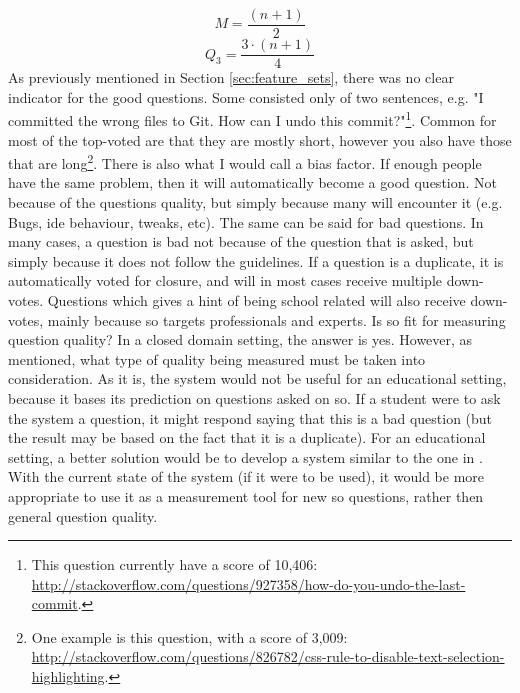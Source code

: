 \begin{equation}\label{eq:quartile2}
M = \frac{(n + 1)}{2}
\end{equation}
\begin{equation}\label{eq:quartile3}
Q_{3} = \frac{3 \cdot (n + 1)}{4}
\end{equation}
As previously mentioned in Section \ref{sec:feature_sets}, there was no clear indicator for the good questions. 
Some consisted only of two sentences, e.g. "I committed the wrong files to Git. How can I undo this commit?"\footnote{
	This question currently have a score of 10,406: \\ 
	\url{http://stackoverflow.com/questions/927358/how-do-you-undo-the-last-commit}.
}. Common for most of the top-voted are that they are mostly short, however you also have those that are long\footnote{
	One example is this question, with a score of 3,009: \\
	\url{http://stackoverflow.com/questions/826782/css-rule-to-disable-text-selection-highlighting}.
}.
There is also what I would call a bias factor. 
If enough people have the same problem, then it will automatically become a good question. 
Not because of the questions quality, but simply because many will encounter it (e.g. Bugs, \gls{ide} behaviour, tweaks, etc).
The same can be said for bad questions. 
In many cases, a question is bad not because of the question that is asked, but simply because it does not follow the guidelines. 
If a question is a duplicate, it is automatically voted for closure, and will in most cases receive multiple down-votes. 
Questions which gives a hint of being school related will also receive down-votes, mainly because \gls{so} targets professionals and experts. 
\vspace{0.5em}\newline
Is \gls{so} fit for measuring question quality?
In a closed domain setting, the answer is yes. 
However, as mentioned, what type of quality being measured must be taken into consideration. 
As it is, the system would not be useful for an educational setting, because it bases its prediction on questions asked on \gls{so}.
If a student were to ask the system a question, it might respond saying that this is a bad question (but the result may be based on the fact that it is a duplicate).
For an educational setting, a better solution would be to develop a system similar to the one in \cite{Lezina2013}.
With the current state of the system (if it were to be used), it would be more appropriate to use it as a measurement tool for new \gls{so} questions, rather then general question quality.

